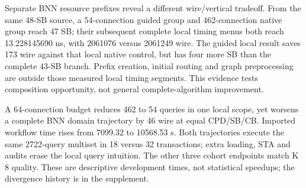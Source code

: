 Separate BNN resource prefixes reveal a different wire/vertical tradeoff. From the same 48-SB source, a 54-connection guided group and 462-connection native group reach 47 SB; their subsequent complete local timing menus both reach 13.228145690 ns, with 2061076 versus 2061249 wire. The guided local result saves 173 wire against that local native control, but has four more SB than the complete 43-SB branch. Prefix creation, initial routing and graph preprocessing are outside those measured local timing segments. This evidence tests composition opportunity, not general complete-algorithm improvement.

A 64-connection budget reduces 462 to 54 queries in one local scope, yet worsens a complete BNN domain trajectory by 46 wire at equal CPD/SB/CB. Imported workflow time rises from 7099.32 to 10568.53 s. Both trajectories execute the same 2722-query multiset in 18 versus 32 transactions; extra loading, STA and audits erase the local query intuition. The other three cohort endpoints match K 8 quality. These are descriptive development times, not statistical speedups; the divergence history is in the supplement.
